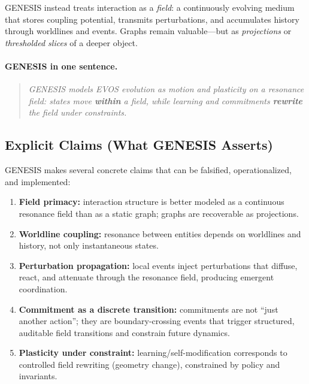 \documentclass[11pt]{article}
\begin{document}
GENESIS instead treats interaction as a \emph{field}: a continuously evolving medium that
stores coupling potential, transmits perturbations, and accumulates history through
worldlines and events. Graphs remain valuable---but as \emph{projections} or
\emph{thresholded slices} of a deeper object.

\vspace{0.5em}
\paragraph{GENESIS in one sentence.}
\begin{quote}
\emph{GENESIS models EVOS evolution as motion and plasticity on a resonance field: states move
\textbf{within} a field, while learning and commitments \textbf{rewrite} the field under constraints.}
\end{quote}

\vspace{0.5em}
\subsection{Explicit Claims (What GENESIS Asserts)}

GENESIS makes several concrete claims that can be falsified, operationalized, and
implemented:

\begin{enumerate}
  \item \textbf{Field primacy:} interaction structure is better modeled as a continuous
  resonance field than as a static graph; graphs are recoverable as projections.

  \item \textbf{Worldline coupling:} resonance between entities depends on worldlines and
  history, not only instantaneous states.

  \item \textbf{Perturbation propagation:} local events inject perturbations that diffuse,
  react, and attenuate through the resonance field, producing emergent coordination.

  \item \textbf{Commitment as a discrete transition:} commitments are not ``just another
  action''; they are boundary-crossing events that trigger structured, auditable field
  transitions and constrain future dynamics.

  \item \textbf{Plasticity under constraint:} learning/self-modification corresponds to
  controlled field rewriting (geometry change), constrained by policy and invariants.
\end{enumerate}
\end{document}
